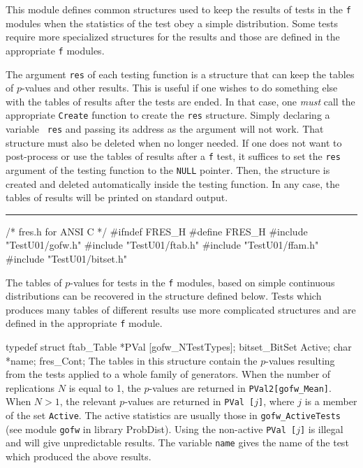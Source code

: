 
This module defines common structures used to keep the results of tests
in the {\tt f} modules when the statistics of the test obey a
simple distribution. Some tests require more specialized structures for
the results and those are defined in the appropriate {\tt f} modules.

The argument {\tt res} of each testing function is a structure
 that can keep the tables of $p$-values and other results.
This is useful if one wishes to do something else with the tables of
results after the tests are ended. In that case, one
{\it must} call the appropriate {\tt Create} function to create the
 {\tt res} structure. Simply declaring a variable  {\tt
res} and passing its address as the argument will not work.
That structure must also be deleted when no longer needed. If one does not
want to post-process or use the tables of results after a {\tt f} test,
it suffices to set the {\tt res} argument of the testing function
to the {\tt NULL} pointer.
Then, the structure is created and deleted automatically inside the
testing function. In any case, the tables of results will be printed on
standard output.

\bigskip
\hrule
\code
\hide
/* fres.h for ANSI C */
#ifndef FRES_H
#define FRES_H
\endhide
#include "TestU01/gofw.h"
#include "TestU01/ftab.h"
#include "TestU01/ffam.h"
#include "TestU01/bitset.h"
\endcode





The tables of $p$-values for tests in the {\tt f} modules, based on simple
continuous distributions can be recovered in the structure defined below.
Tests which produces many tables of different results use more complicated
structures and are defined in the appropriate {\tt f} module.

\code


typedef struct {
   ftab_Table *PVal [gofw_NTestTypes];
   bitset_BitSet Active;
   char *name;
} fres_Cont;
\endcode
 \tab
  The tables in this structure contain the $p$-values resulting from
  the tests applied to a whole family of generators.
  When the number of replications $N$ is equal to 1, the $p$-values
  are returned in {\tt PVal2[gofw\_Mean]}. When $N > 1$, the relevant
  $p$-values are returned in {\tt PVal [$j$]}, where  $j$ is a member
  of the set {\tt Active}. The active statistics are usually those
  in {\tt gofw\_ActiveTests} (see module {\tt gofw} in library
  ProbDist). Using the non-active {\tt PVal [$j$]} is illegal and will
  give unpredictable results. The variable
 {\tt name} gives the name of the test which produced the above results.
 \endtab
\code


